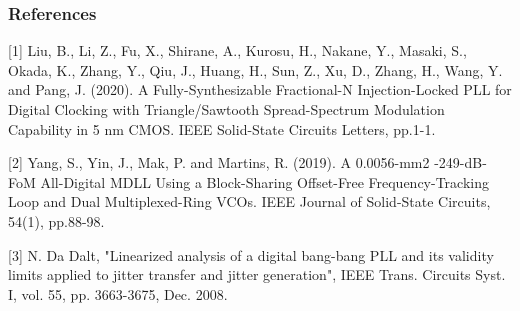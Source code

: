 \documentclass[t, screen, aspectratio=43]{beamer}
\begin{document}
\begin{frame}
	\frametitle{References}
		\scriptsize
		[1] Liu, B., Li, Z., Fu, X., Shirane, A., Kurosu, H., Nakane, Y., Masaki, S., Okada, K., Zhang, Y., Qiu, J., Huang, H., Sun, Z., Xu, D., Zhang, H., Wang, Y. and Pang, J. (2020). A Fully-Synthesizable Fractional-N Injection-Locked PLL for Digital Clocking with Triangle/Sawtooth Spread-Spectrum Modulation Capability in 5 nm CMOS. IEEE Solid-State Circuits Letters, pp.1-1.\par
		\vspace{0.5em}
		[2] Yang, S., Yin, J., Mak, P. and Martins, R. (2019). A 0.0056-mm2 -249-dB-FoM All-Digital MDLL Using a Block-Sharing Offset-Free Frequency-Tracking Loop and Dual Multiplexed-Ring VCOs. IEEE Journal of Solid-State Circuits, 54(1), pp.88-98.\par
		\vspace{0.5em}
		[3] N. Da Dalt, "Linearized analysis of a digital bang-bang PLL and its validity limits applied to jitter transfer and jitter generation", IEEE Trans. Circuits Syst. I, vol. 55, pp. 3663-3675, Dec. 2008.

\end{frame}
\end{document}

